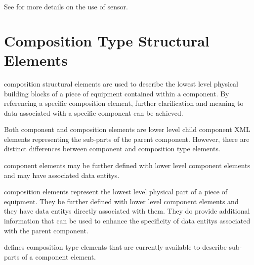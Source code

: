\documentclass{mtconnect}	%
\begin{document}
See  for more details on the use of \gls{sensor}.

\section{Composition Type Structural Elements}
\label{sec:Composition Type Structural Elements}

\gls{composition} \glspl{structural element} are used to describe the lowest level physical building blocks of a piece of equipment contained within a \gls{component}. By referencing a specific \gls{composition} element, further clarification and meaning to data associated with a specific \gls{component} can be achieved.

Both \gls{component} and \gls{composition} elements are \gls{lower level} child \gls{component} XML elements representing the sub-parts of the parent \gls{component}.  However, there are distinct differences between \gls{component} and \gls{composition} type elements.

\gls{component} elements may be further defined with \gls{lower level} \gls{component} elements and may have associated \glspl{data entity}.

\gls{composition} elements represent the lowest level physical part of a piece of equipment.  They \mustnot be further defined with \gls{lower level} \gls{component} elements and they \mustnot have \glspl{data entity} directly associated with them.   They do provide additional information that can be used to enhance the specificity of \glspl{data entity} associated with the parent \gls{component}.

 defines \gls{composition} type elements that are currently available to describe sub-parts of a \gls{component} element.
\end{document}
